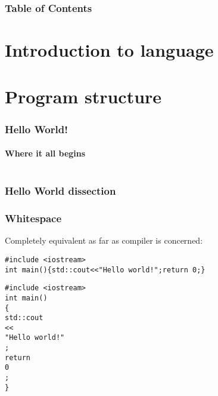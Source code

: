 \documentclass{beamer}
\subtitle{Session 1: Basics}
\begin{document}
\frame{\titlepage}

\begin{frame}
\frametitle{Table of Contents}
\tableofcontents
\end{frame}

\section{Introduction to language}



\section{Program structure}



\begin{frame}[fragile]
  \frametitle{Hello World!}
  \framesubtitle{Where it all begins}

  \begin{columns}[t]
    \begin{column}[T]{0.55\textwidth}	
    \end{column}
    \begin{column}[T]{0.45\textwidth}
		\end{column}
	\end{columns}
\end{frame}


\begin{frame}[fragile]
  \frametitle{Hello World dissection}
  \begin{semiverbatim}
  \end{semiverbatim}
\end{frame}

\begin{frame}[fragile]
  \frametitle{Whitespace}
  \pause
  
  Completely equivalent as far as compiler is concerned:
  \begin{lstlisting}
#include <iostream>
int main(){std::cout<<"Hello world!";return 0;}
  \end{lstlisting}
  \begin{lstlisting}
#include <iostream>
int main()
{
std::cout
<<
"Hello world!"
;
return
0
;
}  \end{lstlisting}
\end{frame}
\end{document}
